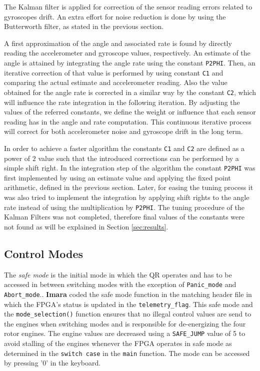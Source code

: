 \documentclass{article}
\begin{document}
The Kalman filter is applied for correction of the sensor reading errors related to gyroscopes drift. An extra effort for noise reduction is done by using the Butterworth filter, as stated in the previous section.

A first approximation of the angle and associated rate is found by directly reading the accelerometer and gyroscope values, respectively. An estimate of the angle is attained by integrating the angle rate using the constant \texttt{P2PHI}. Then, an iterative correction of that value is performed by using constant \texttt{C1} and comparing the actual estimate and accelerometer reading. Also the value obtained for the angle rate is corrected in a similar way by the constant \texttt{C2}, which will influence the rate integration in the following iteration. By adjusting the values of the referred constants, we define the weight or influence that each sensor reading has in the angle and rate computation. This continuous iterative process will correct for both accelerometer noise and gyroscope drift in the long term.

In order to achieve a faster algorithm the constants \texttt{C1} and \texttt{C2} are defined as a power of $2$ value such that the introduced corrections can be performed by a simple shift right. In the integration step of the algorithm the constant \texttt{P2PHI} was first implemented by using an estimate value and applying the fixed point arithmetic, defined in the previous section. Later, for easing the tuning process it was also tried to implement the integration by applying shift rights to the angle rate instead of using the multiplication by \texttt{P2PHI}. The tuning procedure of the Kalman Filters was not completed, therefore final values of the constants were not found as will be explained in Section \ref{sec:results}.


\subsection{Control Modes}

\label{sec:safemode}
The \emph{safe mode} is the initial mode in which the QR operates and has to be accessed in between switching modes with the exception of \texttt{Panic\_mode} and \texttt{Abort\_mode}.. \textbf{Imara} coded the safe mode function in the matching header file in which the FPGA's status is updated in the \texttt{telemetry\_flag}. This safe mode and the \texttt{mode\_selection()} function ensures that no illegal control values are send to the engines when switching modes and is responsible for de-energizing the four rotor engines. The engine values are decreased using a \texttt{SAFE\_JUMP} value of 5 to avoid stalling of the engines whenever the FPGA operates in safe mode as determined in the \texttt{switch case} in the \texttt{main} function. The mode can be accessed by pressing '$0$' in the keyboard.\\
\end{document}
